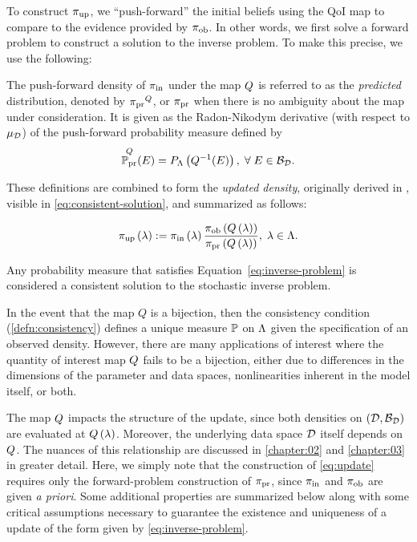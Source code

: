 To construct $\operatorname*{\pi_{up}}$, we ``push-forward'' the initial beliefs using the QoI map to compare to the evidence provided by $\operatorname*{\pi_{ob}}$. 
In other words, we first solve a forward problem to construct a solution to the inverse problem. 
To make this precise, we use the following:

\begin{defn}\label{defn:predicted}
The push-forward density of $\operatorname*{\pi_{in}}$ under the map $Q$ is referred to as the \emph{predicted} distribution, denoted by $\operatorname*{\pi_{pr}}^Q$, or $\operatorname*{\pi_{pr}}$ when there is no ambiguity about the map under consideration. 
It is given as the Radon-Nikodym derivative (with respect to $\mu_{\mathcal{D}}$) of the push-forward probability measure defined by 
\begin{equation}\label{eq:updated-measure}
\operatorname*{\mathbb{P}_{pr}}^Q (E)  = P_{\Lambda} \left ( Q^{-1}(E) \right ), \; \forall \; E \in \mathcal{B}_{\mathcal{D}}.
\end{equation}
\end{defn}

These definitions are combined to form the \emph{updated density}, originally derived in \cite{BJW18}, visible in \ref{eq:consistent-solution}, and summarized as follows:
\begin{defn}\label{defn:updated}
\begin{equation}\label{eq:updated}
\operatorname*{\pi_{up}} \left ( \lambda \right ) := \operatorname*{\pi_{in}} \left ( \lambda \right ) \frac{\operatorname*{\pi_{ob}} \left ( Q\left ( \lambda \right ) \right ) }{\operatorname*{\pi_{pr}} \left ( Q\left ( \lambda \right ) \right ) }, \; \lambda \in {\Lambda}.
\end{equation}
\end{defn}

Any probability measure that satisfies Equation~\eqref{eq:inverse-problem} is considered a consistent solution to the stochastic inverse problem.

In the event that the map $Q$ is a bijection, then the consistency condition (\ref{defn:consistency}) defines a unique measure $\mathbb{P}$ on ${\Lambda}$ given the specification of an observed density.
However, there are many applications of interest where the quantity of interest map $Q$ fails to be a bijection, either due to differences in the dimensions of the parameter and data spaces, nonlinearities inherent in the model itself, or both. 

The map $Q$ impacts the structure of the update, since both densities on $(\mathcal{D}, \mathcal{B}_{\mathcal{D}})$ are evaluated at $Q\left ( \lambda \right )$.
Moreover, the underlying data space $\mathcal{D}$ itself depends on $Q$.
The nuances of this relationship are discussed in \ref{chapter:02} and \ref{chapter:03} in greater detail.
Here, we simply note that the construction of \eqref{eq:update} requires only the forward-problem construction of $\operatorname*{\pi_{pr}}$, since $\operatorname*{\pi_{in}}$ and $\operatorname*{\pi_{ob}}$ are given \emph{a priori}.
Some additional properties are summarized below along with some critical assumptions necessary to guarantee the existence and uniqueness of a update of the form given by \eqref{eq:inverse-problem}. 
